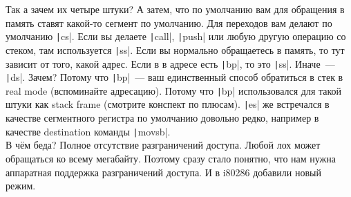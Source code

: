 \documentclass{article}
\begin{document}
    Так а зачем их четыре штуки? А затем, что по умолчанию вам для обращения в память ставят какой-то сегмент по умолчанию. Для переходов вам делают по умолчанию \texttt|cs|. Если вы делаете \texttt|call|, \texttt|push| или любую другую операцию со стеком, там используется \texttt|ss|. Если вы нормально обращаетесь в память, то тут зависит от того, какой адрес. Если в в адресе есть \texttt|bp|, то это \texttt|ss|. Иначе~--- \texttt|ds|. Зачем? Потому что \texttt|bp|~--- ваш единственный способ обратиться в стек в real mode (вспоминайте адресацию). Потому что \texttt|bp| использовался для такой штуки как stack frame (смотрите конспект по плюсам). \texttt|es| же встречался в качестве сегментного регистра по умолчанию довольно редко, например в качестве destination команды \texttt|movsb|.\\
    В чём беда? Полное отсутствие разграничений доступа. Любой лох может обращаться ко всему мегабайту. Поэтому сразу стало понятно, что нам нужна аппаратная поддержка разграничений доступа. И в i80286 добавили новый режим.
\end{document}
